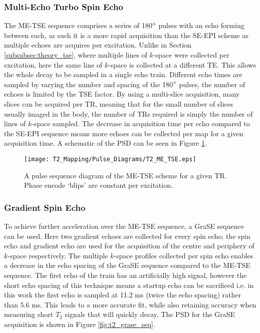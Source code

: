 \newpage
\subsubsection{Multi-Echo Turbo Spin Echo}
The \acf{ME-TSE} sequence comprises a series of 180$\degree$ pulses with an echo forming between each, as such it is a more rapid acquisition than the \ac{SE}-\ac{EPI} scheme as multiple echoes are acquires per excitation. Unlike in Section \ref{subsubsec:theory_tse}, where multiple lines of $k$-space were collected per excitation, here the same line of $k$-space is collected at a different \ac{TE}. This allows the whole \ttwo decay to be sampled in a single echo train. Different echo times are sampled by varying the number and spacing of the 180$\degree$ pulses, the number of echoes is limited by the \ac{TSE} factor. By using a multi-slice acquisition, many slices can be acquired per \ac{TR}, meaning that for the small number of slices usually imaged in the body, the number of \acp{TR} required is simply the number of lines of $k$-space sampled. The decrease in acquisition time per echo compared to the \ac{SE}-\ac{EPI} sequence means more echoes can be collected per \ttwo map for a given acquisition time. A schematic of the \ac{PSD} can be seen in Figure \ref{fig:t2_me-tse_seq}.

\begin{figure}[H]
	\centering
	\texttt{[image: T2\_Mapping/Pulse\_Diagrams/T2\_ME\_TSE.eps]}
	\caption{A pulse sequence diagram of the \ac{ME-TSE} scheme for a given \ac{TR}. Phase encode `blips' are constant per excitation.}
	\label{fig:t2_me-tse_seq}	
\end{figure}

\newpage
\subsubsection{Gradient Spin Echo}

To achieve further acceleration over the \acf{ME-TSE} sequence, a \ac{GraSE} sequence can be used. Here two gradient echoes are collected for every spin echo; the spin echo and gradient echo are used for the acquisition of the centre and periphery of $k$-space respectively. The multiple $k$-space profiles collected per spin echo enables a decrease in the echo spacing of the \ac{GraSE} sequence compared to the \ac{ME-TSE} sequence. The first echo of the train has an artificially high signal, however the short echo spacing of this technique means a startup echo can be sacrificed i.e. in this work the first echo is sampled at 11.2 ms (twice the echo spacing) rather than 5.6 ms. This leads to a more accurate fit, while also retaining accuracy when measuring short $T_2$ signals that will quickly decay. The \ac{PSD} for the \ac{GraSE} acquisition is shown in Figure \ref{fig:t2_grase_seq}.

